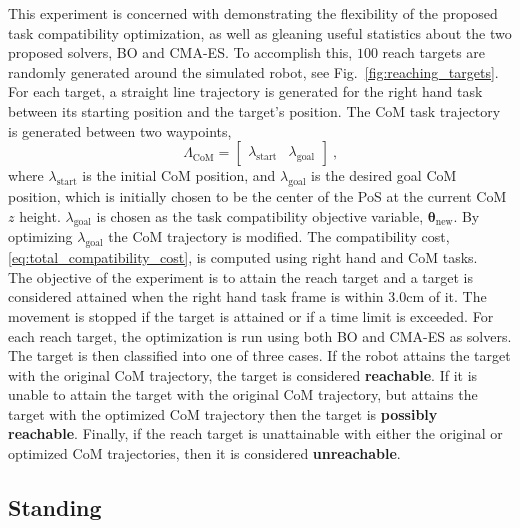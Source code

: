 \documentclass[12pt,a4paper,twoside]{article}
\newcommand{\bs}[1]{\boldsymbol{#1}}
\newcommand{\tc}{\ \text{,}}
\newcommand{\obj}{\bs{\theta}}
\begin{document}
    This experiment is concerned with demonstrating the flexibility of the proposed task compatibility optimization, as well as gleaning useful statistics about the two proposed solvers, BO and CMA-ES. To accomplish this, $100$ reach targets are randomly generated around the simulated robot, see Fig.~\ref{fig:reaching_targets}. For each target, a straight line trajectory is generated for the right hand task between its starting position and the target's position. The CoM task trajectory is generated between two waypoints,
    \begin{equation}
        \Lambda_{\text{CoM}} = \begin{bmatrix} \lambda_{\text{start}} & \lambda_{\text{goal}} \end{bmatrix} \tc
        \label{eq:com_reaching_waypoints}
    \end{equation}
    where $\lambda_{\text{start}}$ is the initial CoM position, and $\lambda_{\text{goal}}$ is the desired goal CoM position, which is initially chosen to be the center of the PoS at the current CoM $z$ height. $\lambda_{\text{goal}}$ is chosen as the task compatibility objective variable, $\obj_{\text{new}}$. By optimizing $\lambda_{\text{goal}}$ the CoM trajectory is modified. The compatibility cost, \eqref{eq:total_compatibility_cost}, is computed using right hand and CoM tasks.\\


    The objective of the experiment is to attain the reach target and a target is considered attained when the right hand task frame is within $3.0$cm of it. The movement is stopped if the target is attained or if a time limit is exceeded. For each reach target, the optimization is run using both BO and CMA-ES as solvers. The target is then classified into one of three cases. If the robot attains the target with the original CoM trajectory, the target is considered \textbf{reachable}. If it is unable to attain the target with the original CoM trajectory, but attains the target with the optimized CoM trajectory then the target is \textbf{possibly reachable}. Finally, if the reach target is unattainable with either the original or optimized CoM trajectories, then it is considered \textbf{unreachable}.


\subsection{Standing}
\label{sec:experiments_standing}
\end{document}
